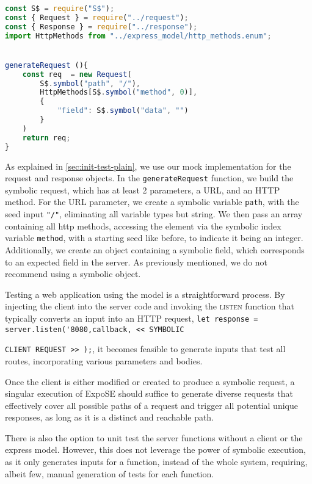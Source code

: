 \begin{lstlisting}[language=JavaScript, float, caption={[Example Client]An Example Client for symbolic requests}, label={lst:client-example}]
const S$ = require("S$");
const { Request } = require("../request");
const { Response } = require("../response");
import HttpMethods from "../express_model/http_methods.enum";


generateRequest (){
    const req  = new Request(
        S$.symbol("path", "/"),
        HttpMethods[S$.symbol("method", 0)],
        {
            "field": S$.symbol("data", "")
        }
    )
    return req;
}
\end{lstlisting}
As explained in \autoref{sec:init-test-plain}, we use our mock implementation for the request and response objects. In the \lstinline{generateRequest} function, we build the symbolic request, which has at least 2 parameters, a URL, and an HTTP method. For the URL parameter, we create a symbolic variable \lstinline{path}, with the seed input \lstinline{"/"}, eliminating all variable types but string. 
We then pass an array containing all http methods, accessing the element via the symbolic index variable \lstinline{method}, with a starting seed like before, to indicate it being an integer.
Additionally, we create an object containing a symbolic field, which corresponds to an expected field in the server. As previously mentioned, we do not recommend using a symbolic object.


Testing a web application using the model is a straightforward process.
By injecting the client into the server code and invoking the \textsc{listen}
function  that typically converts an input into an HTTP request, \lstinline{let response = server.listen('8080,callback, << SYMBOLIC } \par\noindent\lstinline{CLIENT REQUEST >> );}, it becomes feasible to generate inputs that test all routes, incorporating various parameters and bodies.


Once the client is either modified or created to produce a symbolic request, 
a singular execution of ExpoSE should suffice to generate diverse requests that effectively cover all possible paths of a request and trigger all potential unique responses, as long as it is a distinct and reachable path.  

There is also the option to unit test the server functions without a client or the express model. However, this does not leverage the power of symbolic execution, as it only generates inputs for a function, instead of the whole system, requiring, albeit few, manual generation of tests for each function.

